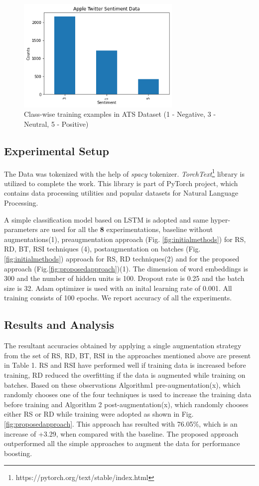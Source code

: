 \documentclass{article}
\begin{document}
\begin{figure}[h!]
\centering
  \includegraphics[width=0.7\textwidth]{dataset.png}
  \caption{Class-wise training examples in ATS Dataset (1 - Negative, 3 - Neutral, 5 - Positive)}
  \label{fig:dataset}
\end{figure}

\subsection{Experimental Setup}
The Data was tokenized with the help of \textit{spacy}\cite{srinivasa2018natural} tokenizer. \textit{TorchText}\footnote{https://pytorch.org/text/stable/index.html} library is utilized to complete the work. This library is part of PyTorch project, which contains data processing utilities and popular datasets for Natural Language Processing. 

A simple classification model based on LSTM is adopted and same hyper-parameters are used for all the \textbf{8} experimentations, baseline without augmentations(1), preaugmentation approach (Fig. \ref{fig:initialmethods}) for RS, RD, BT, RSI techniques (4), postaugmentation on batches (Fig. \ref{fig:initialmethods}) approach for RS, RD techniques(2) and for the proposed approach (Fig.\ref{fig:proposedapproach})(1). The dimension of word embeddings is 300 and the number of hidden units is 100. Dropout rate is 0.25 and the batch size is 32. Adam optimizer is used with an inital learning rate of 0.001. All training consists of 100 epochs. We report accuracy of all the experiments.

\subsection{Results and Analysis}
The resultant accuracies obtained by applying a single augmentation strategy from the set of RS, RD, BT, RSI in the approaches mentioned above are present in Table 1. RS and RSI have performed well if training data is increased before training, RD reduced the overfitting if the data is augmented while training on batches. Based on these observations Algorithm1 pre-augmentation(x), which randomly chooses one of the four techniques is used to increase the training data before training and Algorithm 2 post-augmentation(x), which randomly chooses either RS or RD while training were adopted as shown in Fig. \ref{fig:proposedapproach}. This approach has resulted with 76.05\%, which is an increase of +3.29, when compared with the baseline. The proposed approach outperformed all the simple approaches to augment the data for performance boosting. 
\end{document}
